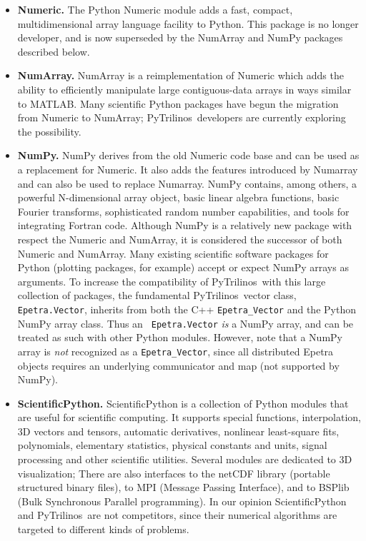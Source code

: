 \documentclass[acmtocl]{acmtrans2m}
\newcommand{\PyTrilinos}{{PyTrilinos}}
\begin{document}
\begin{itemize}

\item {\bf Numeric.} The Python Numeric module adds a fast, compact,
  multidimensional array language facility to Python.   This package is no
  longer developer, and is now
  superseded by the NumArray and NumPy packages described below.

\item {\bf NumArray.}  NumArray is a reimplementation of Numeric which
  adds the ability to efficiently manipulate large contiguous-data
  arrays in ways similar to MATLAB.  Many scientific Python packages
  have begun the migration from Numeric to NumArray;
  \PyTrilinos\ developers are currently exploring the possibility.

\item {\bf NumPy.} NumPy derives from the old Numeric code base and can be
  used as a replacement for Numeric.   It also adds the features introduced by
  Numarray and can also be used to replace Numarray. NumPy contains, among
  others, a powerful N-dimensional array object, 
  basic linear algebra functions, basic Fourier transforms,
  sophisticated random number capabilities, and tools for integrating Fortran
  code. Although NumPy is a relatively new package with respect the Numeric
  and NumArray, it is considered the successor of both Numeric and NumArray.
  Many existing
  scientific software packages for Python (plotting packages, for
  example) accept or expect NumPy arrays as arguments.  To increase
  the compatibility of \PyTrilinos\ with this large collection of
  packages, the fundamental \PyTrilinos\ vector class, {\tt
    Epetra.Vector}, inherits from both the C++ {\tt Epetra\_Vector}
  and the Python NumPy array class.  Thus an {\tt
    Epetra.Vector} {\sl is} a NumPy array, and can be treated as
  such with other Python modules.  However, note that a NumPy array
  is {\sl not} recognized as a {\tt Epetra\_Vector}, since all
  distributed Epetra objects requires an underlying communicator and
  map (not supported by NumPy).

\item {\bf ScientificPython.}  ScientificPython is a collection of
  Python modules that are useful for scientific computing.  It
  supports special functions, interpolation, 3D vectors and tensors,
  automatic derivatives, nonlinear least-square fits, polynomials,
  elementary statistics, physical constants and units, signal
  processing and other scientific utilities.  Several modules are
  dedicated to 3D visualization; There are also interfaces to the
  netCDF library (portable structured binary files), to MPI (Message
  Passing Interface), and to BSPlib (Bulk Synchronous Parallel
  programming).  In our opinion ScientificPython and \PyTrilinos\ are
  not competitors, since their numerical algorithms are targeted to
  different kinds of problems.


\end{itemize}
\end{document}
